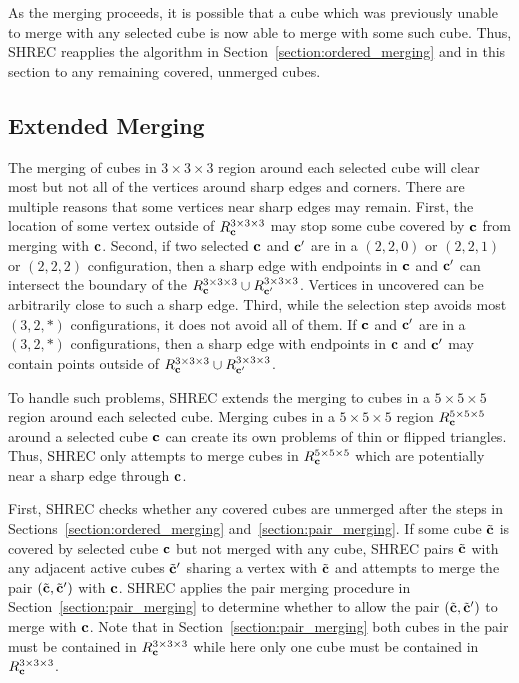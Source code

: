 As the merging proceeds,
it is possible that a cube which was previously unable 
to merge with any selected cube
is now able to merge with some such cube.
Thus, SHREC reapplies the algorithm in Section~\ref{section:ordered_merging}
and in this section to any remaining covered, unmerged cubes.


\subsection{Extended Merging}
\label{section:extended_merging}

The merging of cubes in $3 \times 3 \times 3$ region
around each selected cube will clear most but not all of the vertices 
around sharp edges and corners.
There are multiple reasons that some vertices near sharp edges may remain.
First, the location of some vertex outside of $R^{3 \times 3 \times 3}_{\mathbf{c}}$
may stop some cube covered by $\mathbf{c}$ from merging with $\mathbf{c}$.
Second, if two selected $\mathbf{c}$ and $\mathbf{c}'$ are 
in a $(2,2,0)$ or $(2,2,1)$ or $(2,2,2)$ configuration, 
then a sharp edge with endpoints in $\mathbf{c}$ and $\mathbf{c}'$ can intersect
the boundary of the $R^{3 \times 3 \times 3}_{\mathbf{c}} \cup R^{3 \times 3 \times 3}_{\mathbf{c}'}$.
Vertices in uncovered can be arbitrarily close to such a sharp edge.
Third, while the selection step avoids most $(3,2,*)$ configurations,
it does not avoid all of them.
If $\mathbf{c}$ and $\mathbf{c}'$ are in a $(3,2,*)$ configurations,
then a sharp edge with endpoints in $\mathbf{c}$ and $\mathbf{c}'$ may contain points
outside of $R^{3 \times 3 \times 3}_{\mathbf{c}} \cup R^{3 \times 3 \times 3}_{\mathbf{c}'}$.

To handle such problems, SHREC extends the merging to cubes
in a $5 \times 5 \times 5$ region around each selected cube.
Merging cubes in a $5 \times 5 \times 5$ region $R^{5 \times 5 \times 5}_{\mathbf{c}}$
around a selected cube $\mathbf{c}$ can create its own problems 
of thin or flipped triangles.
Thus, SHREC only attempts to merge cubes in $R^{5 \times 5 \times 5}_{\mathbf{c}}$
which are potentially near a sharp edge through $\mathbf{c}$.

First, SHREC checks whether any covered cubes are unmerged
after the steps in Sections~\ref{section:ordered_merging}
and~\ref{section:pair_merging}.
If some cube ${\tilde{\mathbf{c}}}$ is covered by selected cube $\mathbf{c}$
but not merged with any cube,
SHREC pairs ${\tilde{\mathbf{c}}}$ with any adjacent active cubes ${\tilde{\mathbf{c}}}'$
sharing a vertex with ${\tilde{\mathbf{c}}}$
and attempts to merge the pair $({\tilde{\mathbf{c}}},{\tilde{\mathbf{c}}}')$ with $\mathbf{c}$.
SHREC applies the pair merging procedure
in Section~\ref{section:pair_merging} to determine whether
to allow the pair $({\tilde{\mathbf{c}}},{\tilde{\mathbf{c}}}')$ to merge with $\mathbf{c}$.
Note that in Section~\ref{section:pair_merging} both cubes in the pair
must be contained in $R^{3 \times 3 \times 3}_{\mathbf{c}}$ while here only one cube
must be contained in $R^{3 \times 3 \times 3}_{\mathbf{c}}$.

